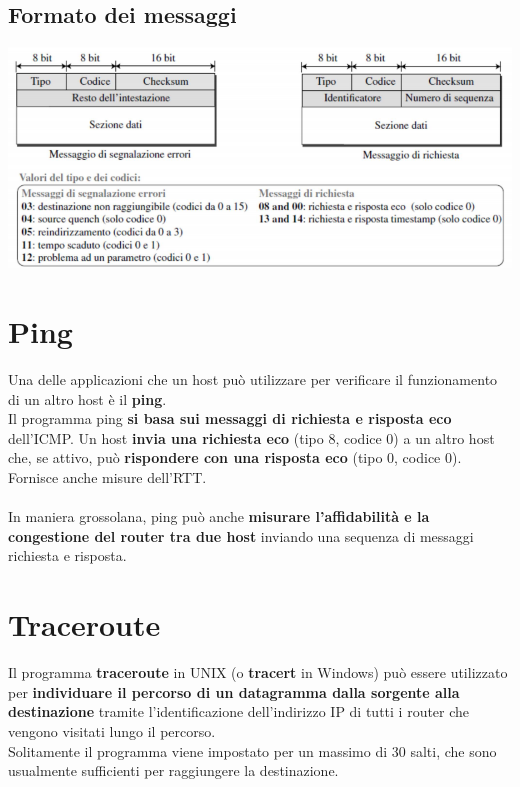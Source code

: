 \documentclass[10pt]{article}
\begin{document}
\subsection{Formato dei messaggi}
\begin{center}
\includegraphics[scale=0.7]{icmpmessaggi.png}
\end{center}
\section{Ping}
Una delle applicazioni che un host può utilizzare per verificare il funzionamento di un altro host è il \textbf{ping}.\\
Il programma ping \textbf{si basa sui messaggi di richiesta e risposta eco} dell'ICMP. Un host \textbf{invia una richiesta eco} (tipo 8, codice 0) a un altro host che, se attivo, può \textbf{rispondere con una risposta eco} (tipo 0, codice 0). Fornisce anche misure dell'RTT.\\\\
In maniera grossolana, ping può anche \textbf{misurare l'affidabilità e la congestione del router tra due host} inviando una sequenza di messaggi richiesta e risposta.
\pagebreak
\section{Traceroute}
Il programma \textbf{traceroute} in UNIX (o \textbf{tracert} in Windows) può essere utilizzato per \textbf{individuare il percorso di un datagramma dalla sorgente alla destinazione} tramite l'identificazione dell'indirizzo IP di tutti i router che vengono visitati lungo il percorso.\\
Solitamente il programma viene impostato per un massimo di 30 salti, che sono usualmente sufficienti per raggiungere la destinazione.
\end{document}
